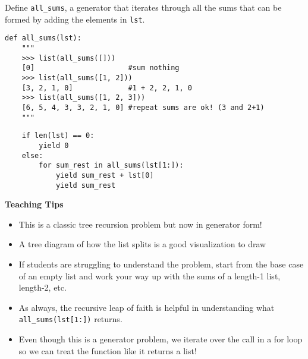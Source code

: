 \begin{blocksection}
\question Define \lstinline$all_sums$, a generator that iterates through all the sums that can be formed by adding the elements in \lstinline$lst$.
\begin{lstlisting}
def all_sums(lst):
    """
    >>> list(all_sums([]))
    [0]                      #sum nothing
    >>> list(all_sums([1, 2]))
    [3, 2, 1, 0]             #1 + 2, 2, 1, 0
    >>> list(all_sums([1, 2, 3]))
    [6, 5, 4, 3, 3, 2, 1, 0] #repeat sums are ok! (3 and 2+1)
    """
\end{lstlisting}

\begin{solution}[1.5in]
\begin{lstlisting}
    if len(lst) == 0:
        yield 0
    else:
        for sum_rest in all_sums(lst[1:]):
            yield sum_rest + lst[0]
            yield sum_rest
\end{lstlisting}
\end{solution}
\end{blocksection}

\begin{blocksection}
    \begin{guide}
        \textbf{Teaching Tips}
        \begin{itemize}
            \item This is a classic tree recursion problem but now in generator form!
            \item A tree diagram of how the list splits is a good visualization to draw
            \item If students are struggling to understand the problem, start from the base case of an empty list and work your way up with the sums of a length-1 list, length-2, etc.
            \item As always, the recursive leap of faith is helpful in understanding what \lstinline{all_sums(lst[1:])} returns.
            \item Even though this is a generator problem, we iterate over the call in a for loop so we can treat the function like it returns a list!
        \end{itemize}
    \end{guide}
\end{blocksection}
